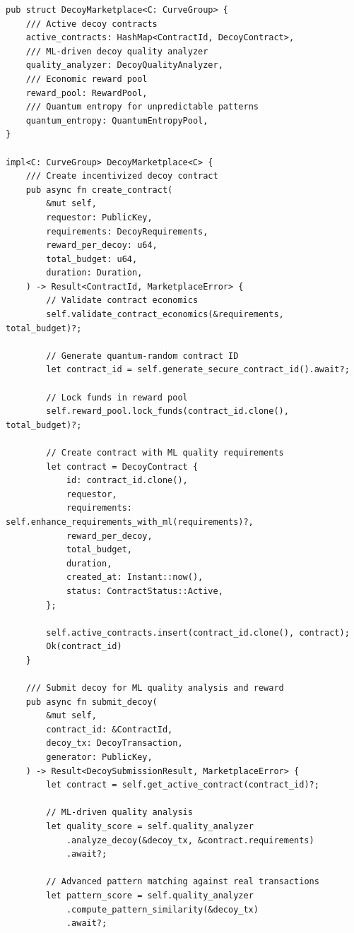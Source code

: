 \documentclass[12pt,a4paper]{article}
\begin{document}
\begin{lstlisting}[style=rustcode, caption=Decoy Marketplace Implementation]
pub struct DecoyMarketplace<C: CurveGroup> {
    /// Active decoy contracts
    active_contracts: HashMap<ContractId, DecoyContract>,
    /// ML-driven decoy quality analyzer
    quality_analyzer: DecoyQualityAnalyzer,
    /// Economic reward pool
    reward_pool: RewardPool,
    /// Quantum entropy for unpredictable patterns
    quantum_entropy: QuantumEntropyPool,
}

impl<C: CurveGroup> DecoyMarketplace<C> {
    /// Create incentivized decoy contract
    pub async fn create_contract(
        &mut self,
        requestor: PublicKey,
        requirements: DecoyRequirements,
        reward_per_decoy: u64,
        total_budget: u64,
        duration: Duration,
    ) -> Result<ContractId, MarketplaceError> {
        // Validate contract economics
        self.validate_contract_economics(&requirements, total_budget)?;
        
        // Generate quantum-random contract ID
        let contract_id = self.generate_secure_contract_id().await?;
        
        // Lock funds in reward pool
        self.reward_pool.lock_funds(contract_id.clone(), total_budget)?;
        
        // Create contract with ML quality requirements
        let contract = DecoyContract {
            id: contract_id.clone(),
            requestor,
            requirements: self.enhance_requirements_with_ml(requirements)?,
            reward_per_decoy,
            total_budget,
            duration,
            created_at: Instant::now(),
            status: ContractStatus::Active,
        };
        
        self.active_contracts.insert(contract_id.clone(), contract);
        Ok(contract_id)
    }
    
    /// Submit decoy for ML quality analysis and reward
    pub async fn submit_decoy(
        &mut self,
        contract_id: &ContractId,
        decoy_tx: DecoyTransaction,
        generator: PublicKey,
    ) -> Result<DecoySubmissionResult, MarketplaceError> {
        let contract = self.get_active_contract(contract_id)?;
        
        // ML-driven quality analysis
        let quality_score = self.quality_analyzer
            .analyze_decoy(&decoy_tx, &contract.requirements)
            .await?;
        
        // Advanced pattern matching against real transactions
        let pattern_score = self.quality_analyzer
            .compute_pattern_similarity(&decoy_tx)
            .await?;
        

\end{lstlisting}
\end{document}
